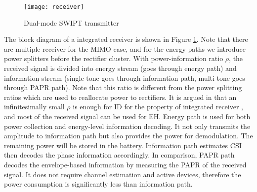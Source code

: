 \begin{figure}\label{fig:receiver}
  \caption{Dual-mode SWIPT transmitter \cite{Park2018}}
  \centering
    \texttt{[image: receiver]}
\end{figure}

The block diagram of a integrated receiver is shown in Figure \ref{fig:receiver}. Note that there are multiple receiver for the MIMO case, and for the energy paths we introduce power splitters before the rectifier cluster. With power-information ratio $\rho $, the received signal is divided into energy stream (goes through energy path) and information stream (single-tone goes through information path, multi-tone goes through PAPR path). Note that this ratio is different from the power splitting ratios which are used to reallocate power to rectifiers. It is argued in \cite{Park2018} that an infinitesimally small $\rho $ is enough for ID for the property of integrated receiver \cite{Zhou2013}, and most of the received signal can be used for EH. Energy path is used for both power collection and energy-level information decoding. It not only transmits the amplitude to information path but also provides the power for demodulation. The remaining power will be stored in the battery. Information path estimates CSI then decodes the phase information accordingly. In comparison, PAPR path decodes the envelope-based information by measuring the PAPR of the received signal. It does not require channel estimation and active devices, therefore the power consumption is significantly less than information path.

